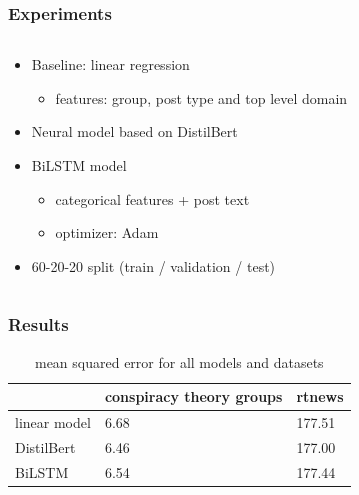 \documentclass[notes]{tum-presentation}
\begin{document}
\begin{frame}
  \frametitle{Experiments}
  \begin{columns}
  \begin{column}{.5\textwidth}
    \begin{itemize}
      \item Baseline: linear regression
      \begin{itemize}
        \item features: group, post type and top level domain
      \end{itemize}
      \item Neural model based on DistilBert~\citep{sanh2020distilbert}
      \item BiLSTM model
      \begin{itemize}
        \item categorical features + post text
        \item optimizer: Adam
      \end{itemize}
      \item 60-20-20 split (train / validation / test)
    \end{itemize}
  \end{column}
  \begin{column}{.5\textwidth}
  \end{column}
  \end{columns}
\end{frame}
\begin{frame}
  \frametitle{Results}
\begin{table}[tb]
    \caption{mean squared error for all models and datasets}
    \label{tab:results-all}
    \centering

    \begin{tabular}{l|l|l}
    \hline

    \hline
    & \textbf{conspiracy theory groups} & \textbf{rtnews}\\
    \hline
    linear model & 6.68 & 177.51\\
    \hline
    DistilBert & 6.46 & 177.00\\
    \hline
    BiLSTM & 6.54 & 177.44\\
    \hline
    \end{tabular}
\end{table}

\end{frame}
\end{document}
